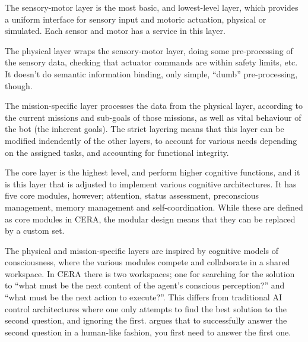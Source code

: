 The sensory-motor layer is the most basic, and lowest-level layer, which
provides a uniform interface for sensory input and motoric actuation, physical
or simulated. Each sensor and motor has a service in this layer.

The physical layer wraps the sensory-motor layer, doing some pre-processing of
the sensory data, checking that actuator commands are within safety limits,
etc. It doesn't do semantic information binding, only simple, ``dumb''
pre-processing, though.

The mission-specific layer processes the data from the physical layer,
according to the current missions and sub-goals of those missions, as well as
vital behaviour of the bot (the inherent goals). The strict layering means that
this layer can be modified indendently of the other layers, to account for
various needs depending on the assigned tasks, and accounting for functional
integrity.

The core layer is the highest level, and perform higher cognitive functions,
and it is this layer that is adjusted to implement various cognitive
architectures. It has five core modules, however; attention, status assessment,
preconscious management, memory management and self-coordination. While these
are defined as core modules in CERA, the modular design means that they can be
replaced by a custom set.

The physical and mission-specific layers are inspired by cognitive models of
consciousness, where the various modules compete and collaborate in a shared
workspace. In CERA there is two workspaces; one for searching for the solution
to ``what must be the next content of the agent's conscious perception?'' and
``what must be the next action to execute?''. This differs from traditional AI
control architectures where one only attempts to find the best solution to the
second question, and ignoring the first. \cite{Arrabales2009} argues that to
successfully answer the second question in a human-like fashion, you first need
to answer the first one.

